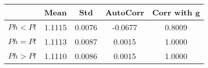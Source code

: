 \begin{tiny}\begin{tabular}{|l|c|c|c|c|}
\hline
&\textbf{Mean}&\textbf{Std}&\textbf{AutoCorr}&\textbf{Corr with g}\\\hline
\textbf{$Ph<Pl$}&1.1115&0.0076&-0.0677&0.8009\\\hline
\textbf{$Ph=Pl$}&1.1113&0.0087&0.0015&1.0000\\\hline
\textbf{$Ph>Pl$}&1.1110&0.0086&0.0015&1.0000\\\hline
\end{tabular}
\end{tiny}